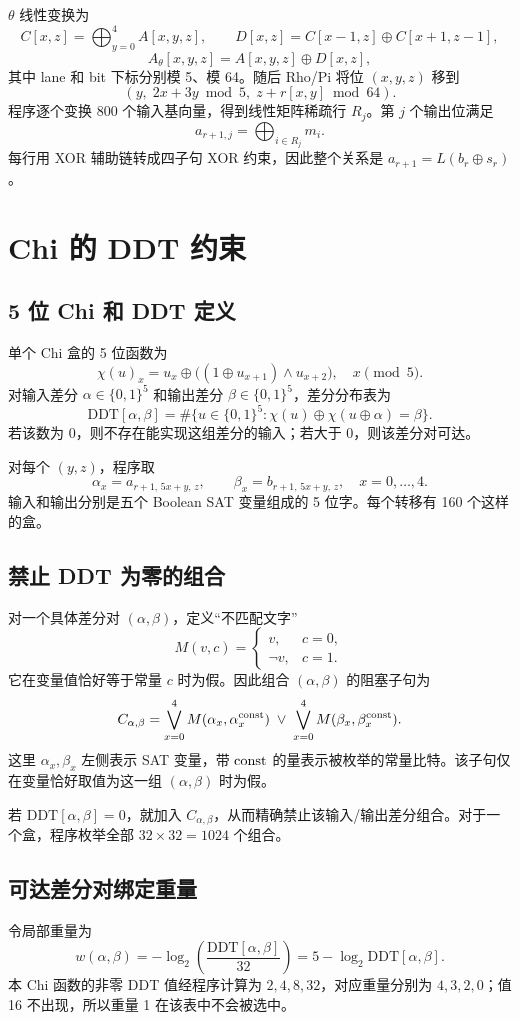 \documentclass[UTF8,a4paper]{ctexart}
\begin{document}
\(\theta\) 线性变换为
\[
C[x,z]=\bigoplus_{y=0}^4 A[x,y,z],\qquad
D[x,z]=C[x-1,z]\oplus C[x+1,z-1],
\]
\[
A_\theta[x,y,z]=A[x,y,z]\oplus D[x,z],
\]
其中 lane 和 bit 下标分别模 5、模 64。随后 Rho/Pi 将位 \((x,y,z)\) 移到
\[
(y,\;2x+3y\bmod5,\;z+r[x,y]\bmod64).
\]
程序逐个变换 800 个输入基向量，得到线性矩阵稀疏行 \(R_j\)。第 \(j\) 个输出位满足
\[
a_{r+1,j}=\bigoplus_{i\in R_j}m_i.
\]
每行用 XOR 辅助链转成四子句 XOR 约束，因此整个关系是 \(a_{r+1}=L(b_r\oplus s_r)\)。

\section{Chi 的 DDT 约束}
\subsection{5 位 Chi 和 DDT 定义}
单个 Chi 盒的 5 位函数为
\[
\chi(u)_x=u_x\oplus\bigl((1\oplus u_{x+1})\land u_{x+2}\bigr),
\quad x\pmod5.
\]
对输入差分 \(\alpha\in\{0,1\}^5\) 和输出差分 \(\beta\in\{0,1\}^5\)，差分分布表为
\[
\mathrm{DDT}[\alpha,\beta]
=\#\{u\in\{0,1\}^5:\chi(u)\oplus\chi(u\oplus\alpha)=\beta\}.
\]
若该数为 0，则不存在能实现这组差分的输入；若大于 0，则该差分对可达。

对每个 \((y,z)\)，程序取
\[
\alpha_x=a_{r+1,\,5x+y,\,z},\qquad
\beta_x=b_{r+1,\,5x+y,\,z},\quad x=0,\ldots,4.
\]
输入和输出分别是五个 Boolean SAT 变量组成的 5 位字。每个转移有 160 个这样的盒。

\subsection{禁止 DDT 为零的组合}
对一个具体差分对 \((\alpha,\beta)\)，定义“不匹配文字”
\[
M(v,c)=\begin{cases}v,&c=0,\\\neg v,&c=1.\end{cases}
\]
它在变量值恰好等于常量 \(c\) 时为假。因此组合 \((\alpha,\beta)\) 的阻塞子句为
\[
C_{\alpha,\beta}=\bigvee_{x=0}^4M(\alpha_x,\alpha_x^{\rm const})
\;\lor\;
\bigvee_{x=0}^4M(\beta_x,\beta_x^{\rm const}).
\]
这里 \(\alpha_x,\beta_x\) 左侧表示 SAT 变量，带 \({\rm const}\) 的量表示被枚举的常量比特。该子句仅在变量恰好取值为这一组 \((\alpha,\beta)\) 时为假。

若 \(\mathrm{DDT}[\alpha,\beta]=0\)，就加入 \(C_{\alpha,\beta}\)，从而精确禁止该输入/输出差分组合。对于一个盒，程序枚举全部 \(32\times32=1024\) 个组合。

\subsection{可达差分对绑定重量}
令局部重量为
\[
w(\alpha,\beta)=-\log_2\left(\frac{\mathrm{DDT}[\alpha,\beta]}{32}\right)
=5-\log_2\mathrm{DDT}[\alpha,\beta].
\]
本 Chi 函数的非零 DDT 值经程序计算为 \(2,4,8,32\)，对应重量分别为 \(4,3,2,0\)；值 16 不出现，所以重量 1 在该表中不会被选中。
\end{document}
